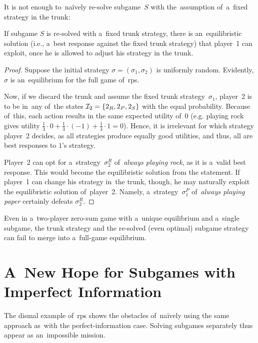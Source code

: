 It is not enough to~na{\"i}vely re-solve subgame~$S$ with the~assumption of~a~fixed strategy in the trunk:
\begin{claim}
  \label{claim:rps-subgame}
  If subgame $S$ is re-solved with a~fixed trunk strategy, there is an~equilibristic solution (i.e., a~best response against the fixed trunk strategy) that player~1 can exploit, once he is allowed to adjust his strategy in the trunk.
\end{claim}
\begin{proof}
  Suppose the initial strategy $\sigma = (\sigma_1, \sigma_2)$ is uniformly random\footnotemark{}.
  Evidently, $\sigma$ is an~equilibrium for the full game of~\acrshort{rps}.

  Now, if we discard the trunk and assume the fixed trunk strategy~$\sigma_1$, player~2 is to be in~any of~the states $\mathcal{I}_2 = \{2_R, 2_P, 2_S\}$ with the equal probability.
  Because of~this, each action results in the same expected utility of~$0$ (e.g. playing rock gives utility $\frac{1}{3} \cdot 0 + \frac{1}{3} \cdot (-1) + \frac{1}{3} \cdot 1 = 0$).
  Hence, it is irrelevant for which strategy player~2 decides, as all strategies produce equally good utilities, and thus, all are best responses to $1$'s strategy\footnotemark.

  Player~2 can opt for a~strategy~$\sigma^R_2$ of~\emph{always playing rock}, as it is a~valid best response.
  This would become the equilibristic solution from the statement.
  If player~1 can change his strategy in~the trunk, though, he may naturally exploit the equilibristic solution of~player~2.
  Namely, a~strategy~$\sigma^P_1$ of~\emph{always playing paper} certainly defeats $\sigma^R_2$.
\end{proof}

\begin{cor}
  Even in a~two-player zero-sum game with a~unique equilibrium and a~single subgame, the trunk strategy and the re-solved (even optimal) subgame strategy can fail to merge into a~full-game equilibrium.
\end{cor}

\section{A~New Hope for Subgames with Imperfect Information}
The dismal example of~\acrshort{rps} shows the obstacles of~na{\"i}vely using the same approach as~with the perfect-information case.
Solving subgames separately thus appear as an~impossible mission. 

